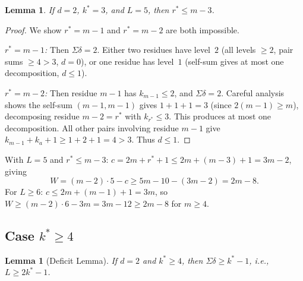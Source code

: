 \documentclass[11pt]{amsart}
\newtheorem{lemma}[theorem]{Lemma}
\theoremstyle{definition}
\theoremstyle{remark}
\begin{document}
\begin{lemma}\label{lem:B-k3-rstar}
If $d = 2$, $k^* = 3$, and $L = 5$, then $r^* \le m - 3$.
\end{lemma}

\begin{proof}
We show $r^* = m - 1$ and $r^* = m - 2$ are both impossible.

\emph{$r^* = m - 1$:} Then $\Sigma\delta = 2$.  Either two residues have level~$2$
(all levels $\ge 2$, pair sums $\ge 4 > 3$, $d = 0$), or one residue has
level~$1$ (self-sum gives at most one decomposition, $d \le 1$).

\emph{$r^* = m - 2$:} Then residue $m - 1$ has $k_{m-1} \le 2$, and
$\Sigma\delta = 2$.  Careful analysis shows the self-sum
$(m-1, m-1)$ gives $1 + 1 + 1 = 3$ (since $2(m-1) \ge m$), decomposing
residue $m - 2 = r^*$ with $k_{r^*} \le 3$.  This produces at most one
decomposition.  All other pairs involving residue $m-1$ give
$k_{m-1} + k_a + 1 \ge 1 + 2 + 1 = 4 > 3$.  Thus $d \le 1$.
\end{proof}

With $L = 5$ and $r^* \le m - 3$:
$c = 2m + r^* + 1 \le 2m + (m - 3) + 1 = 3m - 2$, giving
\[
  W = (m - 2) \cdot 5 - c \ge 5m - 10 - (3m - 2) = 2m - 8.
\]
For $L \ge 6$: $c \le 2m + (m-1) + 1 = 3m$, so
$W \ge (m - 2) \cdot 6 - 3m = 3m - 12 \ge 2m - 8$ for $m \ge 4$.

\subsection{Case $k^* \ge 4$}

\begin{lemma}[Deficit Lemma]\label{lem:deficit}
If $d = 2$ and $k^* \ge 4$, then $\Sigma\delta \ge k^* - 1$,
i.e., $L \ge 2k^* - 1$.
\end{lemma}
\end{document}
